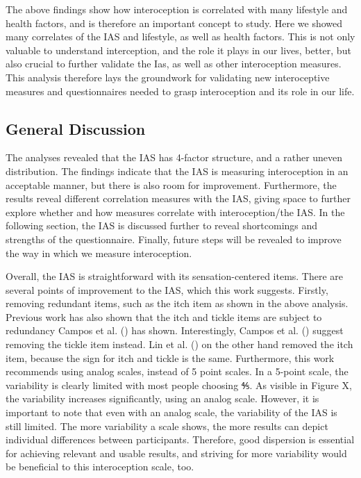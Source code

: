 \documentclass[
  man,
  floatsintext,
  longtable,
  nolmodern,
  notxfonts,
  notimes,
  colorlinks=true,linkcolor=blue,citecolor=blue,urlcolor=blue]{apa7}
\begin{document}
The above findings show how interoception is correlated with many
lifestyle and health factors, and is therefore an important concept to
study. Here we showed many correlates of the IAS and lifestyle, as well
as health factors. This is not only valuable to understand interception,
and the role it plays in our lives, better, but also crucial to further
validate the Ias, as well as other interoception measures. This analysis
therefore lays the groundwork for validating new interoceptive measures
and questionnaires needed to grasp interoception and its role in our
life.

\subsection{General Discussion}\label{general-discussion}

The analyses revealed that the IAS has 4-factor structure, and a rather
uneven distribution. The findings indicate that the IAS is measuring
interoception in an acceptable manner, but there is also room for
improvement. Furthermore, the results reveal different correlation
measures with the IAS, giving space to further explore whether and how
measures correlate with interoception/the IAS. In the following section,
the IAS is discussed further to reveal shortcomings and strengths of the
questionnaire. Finally, future steps will be revealed to improve the way
in which we measure interoception.

Overall, the IAS is straightforward with its sensation-centered items.
There are several points of improvement to the IAS, which this work
suggests. Firstly, removing redundant items, such as the itch item as
shown in the above analysis. Previous work has also shown that the itch
and tickle items are subject to redundancy Campos et al.
() has shown. Interestingly, Campos et
al. () suggest removing the tickle item
instead. Lin et al. () on the other hand
removed the itch item, because the sign for itch and tickle is the same.
Furthermore, this work recommends using analog scales, instead of 5
point scales. In a 5-point scale, the variability is clearly limited
with most people choosing ⅘. As visible in Figure X, the variability
increases significantly, using an analog scale. However, it is important
to note that even with an analog scale, the variability of the IAS is
still limited. The more variability a scale shows, the more results can
depict individual differences between participants. Therefore, good
dispersion is essential for achieving relevant and usable results, and
striving for more variability would be beneficial to this interoception
scale, too.
\end{document}
